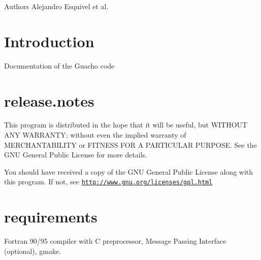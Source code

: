 \begin{DoxyAuthor}{Authors}
Alejandro Esquivel et al.
\end{DoxyAuthor}
\hypertarget{index_intro}{}\section{Introduction}\label{index_intro}
Documentation of the Guacho code



 \hypertarget{index_notes}{}\section{release.\+notes}\label{index_notes}
This program is distributed in the hope that it will be useful, but W\+I\+T\+H\+O\+U\+T A\+N\+Y W\+A\+R\+R\+A\+N\+T\+Y; without even the implied warranty of M\+E\+R\+C\+H\+A\+N\+T\+A\+B\+I\+L\+I\+T\+Y or F\+I\+T\+N\+E\+S\+S F\+O\+R A P\+A\+R\+T\+I\+C\+U\+L\+A\+R P\+U\+R\+P\+O\+S\+E. See the G\+N\+U General Public License for more details.

You should have received a copy of the G\+N\+U General Public License along with this program. If not, see \href{http://www.gnu.org/licenses/gpl.html}{\tt http\+://www.\+gnu.\+org/licenses/gpl.\+html} 

\hypertarget{index_requirements}{}\section{requirements}\label{index_requirements}

\begin{DoxyVerbInclude}
\end{DoxyVerbInclude}
 Fortran 90/95 compiler with C preprocessor, Message Passing Interface (optional), gmake. 

 
